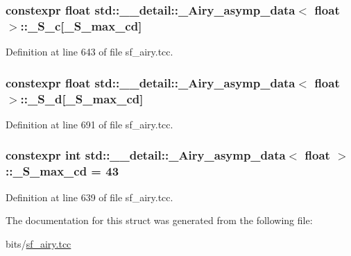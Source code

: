 \subsubsection[{\texorpdfstring{\+\_\+\+S\+\_\+c}{_S_c}}]{\setlength{\rightskip}{0pt plus 5cm}constexpr float {\bf std\+::\+\_\+\+\_\+detail\+::\+\_\+\+Airy\+\_\+asymp\+\_\+data}$<$ float $>$\+::\+\_\+\+S\+\_\+c\mbox{[}{\bf \+\_\+\+S\+\_\+max\+\_\+cd}\mbox{]}\hspace{0.3cm}{\ttfamily [static]}}\hypertarget{structstd_1_1____detail_1_1__Airy__asymp__data_3_01float_01_4_a8fc68acdbcbc59f4ecfdd4bc2f4f2a1e}{}\label{structstd_1_1____detail_1_1__Airy__asymp__data_3_01float_01_4_a8fc68acdbcbc59f4ecfdd4bc2f4f2a1e}


Definition at line 643 of file sf\+\_\+airy.\+tcc.

\subsubsection[{\texorpdfstring{\+\_\+\+S\+\_\+d}{_S_d}}]{\setlength{\rightskip}{0pt plus 5cm}constexpr float {\bf std\+::\+\_\+\+\_\+detail\+::\+\_\+\+Airy\+\_\+asymp\+\_\+data}$<$ float $>$\+::\+\_\+\+S\+\_\+d\mbox{[}{\bf \+\_\+\+S\+\_\+max\+\_\+cd}\mbox{]}\hspace{0.3cm}{\ttfamily [static]}}\hypertarget{structstd_1_1____detail_1_1__Airy__asymp__data_3_01float_01_4_ad947443d5860fcd25d25ad6d04ea3bb3}{}\label{structstd_1_1____detail_1_1__Airy__asymp__data_3_01float_01_4_ad947443d5860fcd25d25ad6d04ea3bb3}


Definition at line 691 of file sf\+\_\+airy.\+tcc.

\subsubsection[{\texorpdfstring{\+\_\+\+S\+\_\+max\+\_\+cd}{_S_max_cd}}]{\setlength{\rightskip}{0pt plus 5cm}constexpr int {\bf std\+::\+\_\+\+\_\+detail\+::\+\_\+\+Airy\+\_\+asymp\+\_\+data}$<$ float $>$\+::\+\_\+\+S\+\_\+max\+\_\+cd = 43\hspace{0.3cm}{\ttfamily [static]}}\hypertarget{structstd_1_1____detail_1_1__Airy__asymp__data_3_01float_01_4_ac0e59b83a90623587f20cdc32a9e7565}{}\label{structstd_1_1____detail_1_1__Airy__asymp__data_3_01float_01_4_ac0e59b83a90623587f20cdc32a9e7565}


Definition at line 639 of file sf\+\_\+airy.\+tcc.



The documentation for this struct was generated from the following file\+:\begin{DoxyCompactItemize}
\item 
bits/\hyperlink{sf__airy_8tcc}{sf\+\_\+airy.\+tcc}\end{DoxyCompactItemize}
